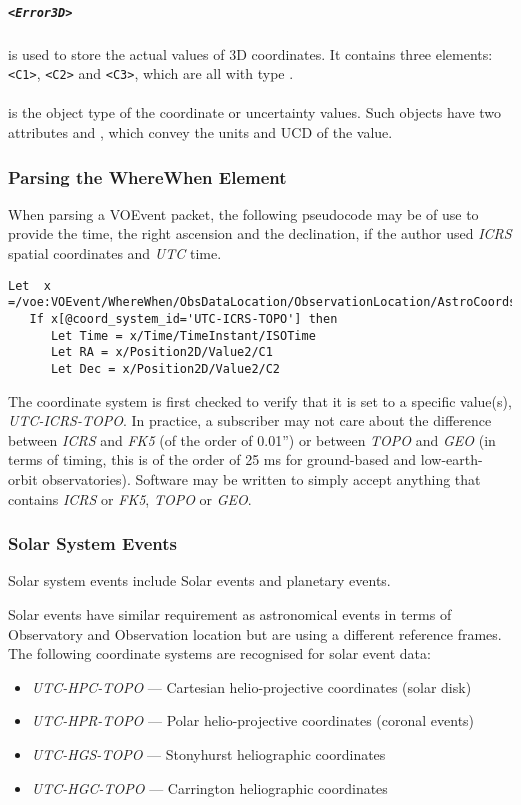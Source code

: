 \documentclass[11pt,a4paper]{ivoa}
\begin{document}
\subparagraph{\texttt{<Error3D>}} is used to store the actual values of 3D
coordinates. It contains three elements: \verb|<C1>|, \verb|<C2>| and
\verb|<C3>|, which are all with type .

\paragraph{} is the object type of the coordinate
or uncertainty values. Such objects have two attributes  and
, which convey the units and UCD of the value.

\subsubsection{Parsing the WhereWhen Element}
\label{sec:3.4.3}
When parsing a VOEvent packet, the following pseudocode may be of use to provide
the time, the right ascension and the declination, if the author used
\emph{ICRS} spatial coordinates and \emph{UTC} time.
\begin{lstlisting}
Let  x =/voe:VOEvent/WhereWhen/ObsDataLocation/ObservationLocation/AstroCoords
   If x[@coord_system_id='UTC-ICRS-TOPO'] then
      Let Time = x/Time/TimeInstant/ISOTime
      Let RA = x/Position2D/Value2/C1
      Let Dec = x/Position2D/Value2/C2
\end{lstlisting}

The coordinate system is first checked to verify that it is set to a specific
value(s), \emph{UTC-ICRS-TOPO}. In practice, a subscriber may not care about the
difference between \emph{ICRS} and \emph{FK5} (of the order of 0.01'') or
between \emph{TOPO} and \emph{GEO} (in terms of timing, this is of the order of
25 ms for ground-based and low-earth-orbit observatories). Software may be
written to simply accept anything that contains \emph{ICRS} or \emph{FK5},
\emph{TOPO} or \emph{GEO}.


\subsubsection{Solar System Events}
\label{sec:3.4.4}
Solar system events include Solar events and planetary events.

Solar events have similar requirement as astronomical events in terms of
Observatory and Observation location but are using a different reference frames.
The following coordinate systems are recognised for solar event data:
\begin{itemize}
\item \emph{UTC-HPC-TOPO} --- Cartesian helio-projective coordinates (solar disk)
\item \emph{UTC-HPR-TOPO} --- Polar helio-projective coordinates (coronal events)
\item \emph{UTC-HGS-TOPO} --- Stonyhurst heliographic coordinates
\item \emph{UTC-HGC-TOPO} --- Carrington heliographic coordinates
\end{itemize}
\end{document}
